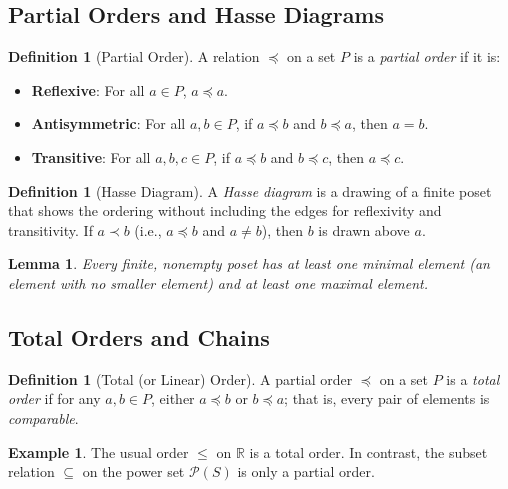 \documentclass[12pt]{article}
\newtheorem{lemma}[theorem]{Lemma}
\theoremstyle{definition}
\newtheorem{definition}[theorem]{Definition}
\newtheorem{example}[theorem]{Example}
\begin{document}
\subsection{Partial Orders and Hasse Diagrams}

\begin{definition}[Partial Order]
  A relation \(\preceq\) on a set \(P\) is a \emph{partial order} if it is:
  \begin{itemize}[itemsep=3pt]
    \item \textbf{Reflexive}: For all \(a \in P\), \(a \preceq a\).
    \item \textbf{Antisymmetric}: For all \(a,b \in P\), if \(a \preceq b\) and \(b \preceq a\), then \(a = b\).
    \item \textbf{Transitive}: For all \(a,b,c \in P\), if \(a \preceq b\) and \(b \preceq c\), then \(a \preceq c\).
  \end{itemize}
\end{definition}

\begin{definition}[Hasse Diagram]
  A \emph{Hasse diagram} is a drawing of a finite poset that shows the ordering without including the edges for reflexivity and transitivity. If \(a \prec b\) (i.e., \(a \preceq b\) and \(a \neq b\)), then \(b\) is drawn above \(a\).
\end{definition}

\begin{lemma}
  Every finite, nonempty poset has at least one \emph{minimal} element (an element with no smaller element) and at least one \emph{maximal} element.
\end{lemma}

\subsection{Total Orders and Chains}

\begin{definition}[Total (or Linear) Order]
  A partial order \(\preceq\) on a set \(P\) is a \emph{total order} if for any \(a, b \in P\), either \(a \preceq b\) or \(b \preceq a\); that is, every pair of elements is \emph{comparable}.
\end{definition}

\begin{example}
  The usual order \(\leq\) on \(\mathbb{R}\) is a total order. In contrast, the subset relation \(\subseteq\) on the power set \(\mathcal{P}(S)\) is only a partial order.
\end{example}
\end{document}
